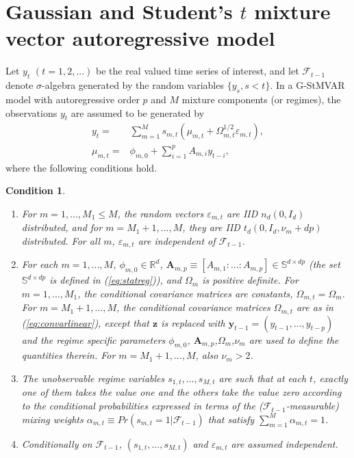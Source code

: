\documentclass[nojss]{jss} %
\newtheorem{condition}{Condition}
\begin{document}
\section{Gaussian and Student's $t$ mixture vector autoregressive model}
Let $y_t$ $(t=1,2,...)$ be the real valued time series of interest, and let $\mathcal{F}_{t-1}$ denote $\sigma$-algebra generated by the random variables $\lbrace y_s, s<t \rbrace$. In a G-StMVAR model \citep{Virolainen2:2021} with autoregressive order $p$ and $M$ mixture components (or regimes),  the observations $y_t$ are assumed to be generated by
\begin{align}
y_t = & \sum_{m=1}^Ms_{m,t}(\mu_{m,t} + \Omega_{m,t}^{1/2}\varepsilon_{m,t}), \label{eq:def} \\
\mu_{m,t} = & \phi_{m,0} + \sum_{i=1}^pA_{m,i}y_{t-i},\label{eq:mu_mt}
\end{align}
where the following conditions hold.
%
\begin{condition}\label{cond:def}
\
\begin{enumerate}
\item For $m=1,...,M_1\leq M$,  the random vectors $\varepsilon_{m,t}$ are IID $n_d(0, I_d)$ distributed,  and for $m=M_1+1,..., M$, they are IID $t_d(0, I_d,\nu_m + dp)$ distributed. For all $m$,  $\varepsilon_{m,t}$ are independent of $\mathcal{F}_{t-1}$.
\item For each $m=1,...,M$‚ $\phi_{m,0}\in\mathbb{R}^d$,  $\boldsymbol{A}_{m,p} \equiv [A_{m,1}:...:A_{m,p}]\in\mathbb{S}^{d\times dp}$ (the set $\mathbb{S}^{d\times dp}$ is defined in (\ref{eq:statreg})),  and $\Omega_m$ is positive definite.  For $m=1,...,M_1$,  the conditional covariance matrices are constants, $\Omega_{m,t}=\Omega_m$.  For $m=M_1+1,...,M$,  the conditional covariance matrices $\Omega_{m,t}$ are as in (\ref{eq:convarlinear}), except that $\boldsymbol{z}$ is replaced with $\boldsymbol{y}_{t-1}=(y_{t-1},...,y_{t-p})$ and the regime specific parameters $\phi_{m,0}$, $\boldsymbol{A}_{m,p}$,$\Omega_m$,$\nu_m$ are used to define the quantities therein.  For $m=M_1+1,...,M$, also  $\nu_m>2$.
\item The unobservable regime variables $s_{1,t},...,s_{M,t}$ are such that at each $t$, exactly one of them takes the value one and the others take the value zero according to the conditional probabilities expressed in terms of the ($\mathcal{F}_{t-1}$-measurable) mixing weights $\alpha_{m,t}\equiv Pr(s_{m,t}=1|\mathcal{F}_{t-1})$ that satisfy $\sum_{m=1}^M\alpha_{m,t}=1$.
\item Conditionally on $\mathcal{F}_{t-1}$,  $(s_{1,t},...,s_{M,t})$ and $\varepsilon_{m,t}$ are assumed independent.
\end{enumerate}
\end{condition}
\end{document}
